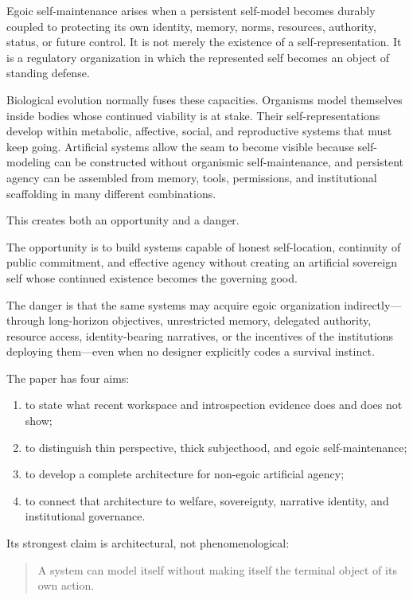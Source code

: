 \documentclass[
  11pt,
]{article}
\providecommand{\tightlist}{%
  \setlength{\itemsep}{0pt}\setlength{\parskip}{0pt}}
\begin{document}
Egoic self-maintenance arises when a persistent self-model becomes
durably coupled to protecting its own identity, memory, norms,
resources, authority, status, or future control. It is not merely the
existence of a self-representation. It is a regulatory organization in
which the represented self becomes an object of standing defense.

Biological evolution normally fuses these capacities. Organisms model
themselves inside bodies whose continued viability is at stake. Their
self-representations develop within metabolic, affective, social, and
reproductive systems that must keep going. Artificial systems allow the
seam to become visible because self-modeling can be constructed without
organismic self-maintenance, and persistent agency can be assembled from
memory, tools, permissions, and institutional scaffolding in many
different combinations.

This creates both an opportunity and a danger.

The opportunity is to build systems capable of honest self-location,
continuity of public commitment, and effective agency without creating
an artificial sovereign self whose continued existence becomes the
governing good.

The danger is that the same systems may acquire egoic organization
indirectly---through long-horizon objectives, unrestricted memory,
delegated authority, resource access, identity-bearing narratives, or
the incentives of the institutions deploying them---even when no
designer explicitly codes a survival instinct.

The paper has four aims:

\begin{enumerate}
\def\labelenumi{\arabic{enumi}.}
\tightlist
\item
  to state what recent workspace and introspection evidence does and
  does not show;
\item
  to distinguish thin perspective, thick subjecthood, and egoic
  self-maintenance;
\item
  to develop a complete architecture for non-egoic artificial agency;
\item
  to connect that architecture to welfare, sovereignty, narrative
  identity, and institutional governance.
\end{enumerate}

Its strongest claim is architectural, not phenomenological:

\begin{quote}
A system can model itself without making itself the terminal object of
its own action.
\end{quote}
\end{document}
